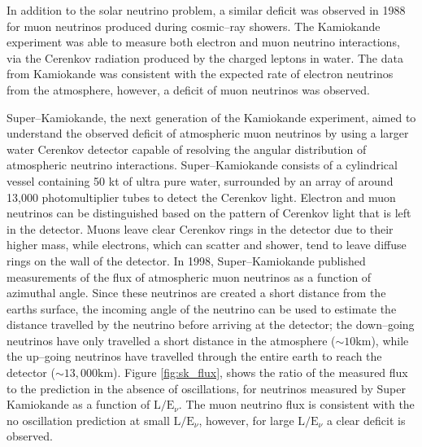 In addition to the solar neutrino problem, a similar deficit was observed in
1988 for muon neutrinos produced during cosmic--ray showers.  The Kamiokande 
experiment was able to measure both electron and muon neutrino interactions,
via the Cerenkov radiation produced by the charged leptons in water. The data
from Kamiokande was consistent with the expected rate of electron neutrinos 
from the atmosphere, however, a deficit of muon neutrinos was 
observed\cite{Hirata1988}. 

Super--Kamiokande, the next generation of the Kamiokande experiment, aimed to
understand the observed deficit of atmospheric muon neutrinos by using a larger 
water Cerenkov detector capable of resolving the angular distribution of 
atmospheric neutrino interactions. Super--Kamiokande consists of a cylindrical 
vessel containing 50 kt of ultra pure water, surrounded by an array of around 
13,000 photomultiplier tubes to detect the Cerenkov light. Electron and muon 
neutrinos can be distinguished based on the pattern of Cerenkov light that is 
left in the detector. Muons leave clear Cerenkov rings in the detector due to 
their higher mass, while electrons, which can scatter and shower, tend to leave 
diffuse  rings on the wall of the detector. In 1998, Super--Kamiokande 
published measurements of the flux of atmospheric muon neutrinos as a function 
of azimuthal angle\cite{Fukuda1998}. Since these neutrinos are created a 
short distance from the earths surface, the incoming angle of the neutrino can 
be used to estimate the distance travelled by the neutrino before arriving at 
the detector; the down--going neutrinos have only travelled a short distance in 
the atmosphere (\(\sim 10 \mbox{km}\)), while the up--going neutrinos have 
travelled through the entire earth to reach the detector 
(\(\sim 13,000 \mbox{km}\)). Figure \ref{fig:sk_flux}, shows the ratio of the
measured flux to the prediction in the absence of oscillations, for neutrinos 
measured by Super Kamiokande as a function of \(\mbox{L} / \mbox{E}_\nu\). The 
muon neutrino flux is consistent with the no oscillation prediction at small 
\(\mbox{L} / \mbox{E}_\nu\), however, for large \(\mbox{L} / \mbox{E}_\nu\) a 
clear deficit is observed. 

